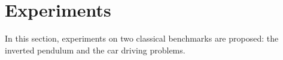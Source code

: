 \documentclass[tablecaption=bottom]{jmlr}
\begin{document}
%
%
%

\section{Experiments}
\label{exp.sec}
In this section, experiments on two classical benchmarks are
proposed: the inverted pendulum and the car driving problems.
\end{document}
